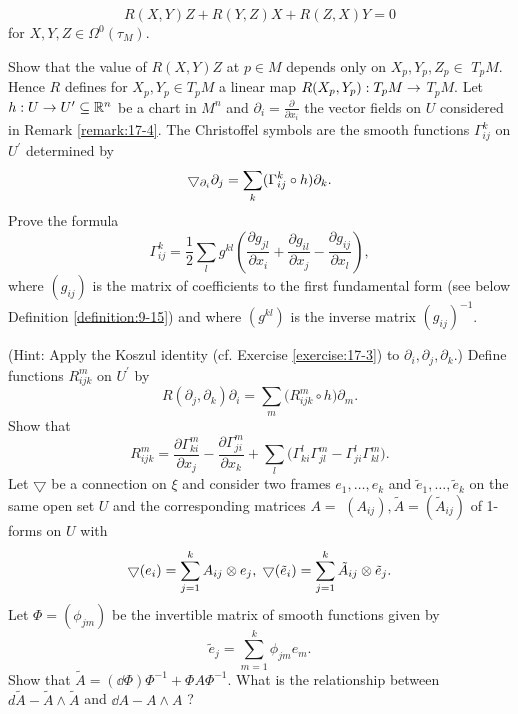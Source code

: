 \begin{enumerate}[\theexercise.1]
    \[
      R( {X,Y}) Z + R( {Y,Z}) X + R( {Z,X}) Y = 0
    \]
    for $X,Y,Z \in  {\Omega }^{0}( {\tau }_{M})$.\par
    Show that the value of $R( {X,Y}) Z$ at $p \in  M$ depends only on ${X}_{p},{Y}_{p},{Z}_{p} \in$  ${T}_{p}M$. Hence $R$ defines for ${X}_{p},{Y}_{p} \in  {T}_{p}M$ a linear map $R( {{X}_{p},{Y}_{p}})  : {T}_{p}M \rightarrow$  ${T}_{p}M$.
  \NewItem Let $h : U \rightarrow  {U}^{\prime } \subseteq  {\ensuremath{\mathbb{R}}}^{n}$ be a chart in ${M}^{n}$ and ${\partial }_{i} = \frac{\partial }{\partial {x}_{i}}$ the vector fields on $U$ considered in Remark \ref{remark:17-4}. The Christoffel symbols are the smooth functions ${\Gamma }_{ij}^{k}$ on ${U}^{\prime }$ determined by
    \[
      \bigtriangledown_{\partial_i}{\partial }_{j} = \sum_{k}( {{\Gamma }_{ij}^{k} \circ  h}) {\partial }_{k}.
    \]
    Prove the formula
    \[
      {\Gamma }_{ij}^{k} = \frac{1}{2}\sum_{l}{g}^{kl}\left( {\frac{\partial {g}_{jl}}{\partial {x}_{i}} + \frac{\partial {g}_{il}}{\partial {x}_{j}}- \frac{\partial {g}_{ij}}{\partial {x}_{l}}}\right),
    \]
    where $( {g}_{ij})$ is the matrix of coefficients to the first fundamental form (see below Definition \ref{definition:9-15}) and where $( {g}^{kl})$ is the inverse matrix ${( {g}_{ij}) }^{-1}$. \par(Hint: Apply the Koszul identity (cf. Exercise \ref{exercise:17-3}) to ${\partial }_{i},{\partial }_{j},{\partial }_{k}$.) Define functions ${R}_{ijk}^{m}$ on ${U}^{\prime }$ by
    \[
      R( {{\partial }_{j},{\partial }_{k}}) {\partial }_{i} = \sum_{m}\big( {{R}_{ijk}^{m} \circ  h}\big) {\partial }_{m}.
    \]
    Show that
    \[
      {R}_{ijk}^{m} = \frac{\partial {\Gamma }_{ki}^{m}}{\partial {x}_{j}}- \frac{\partial {\Gamma }_{ji}^{m}}{\partial {x}_{k}} + \sum_{l}\Big( {{\Gamma }_{ki}^{l}{\Gamma }_{jl}^{m}- {\Gamma }_{ji}^{l}{\Gamma }_{kl}^{m}}\Big).
    \]
  \NewItem Let $\bigtriangledown$ be a connection on $\xi$ and consider two frames ${e}_{1},\ldots,{e}_{k}$ and ${\tilde{e}}_{1},\ldots,{\tilde{e}}_{k}$ on the same open set $U$ and the corresponding matrices $A =$  $( {A}_{ij}),\tilde{A} = ( {\tilde{A}}_{ij})$ of 1-forms on $U$ with
    \[
      \bigtriangledown ( {e}_{i})  = \sum_{{j = 1}}^{k}{A}_{ij} \otimes  {e}_{j},\;\bigtriangledown ( {\tilde{e}}_{i})  = \sum_{{j = 1}}^{k}{\tilde{A}}_{ij} \otimes  {\tilde{e}}_{j}.
    \]
    Let $\Phi  = ( {\phi }_{jm})$ be the invertible matrix of smooth functions given by
    \[
      {\tilde{e}}_{j} = \sum_{{m = 1}}^{k}{\phi }_{jm}{e}_{m}.
    \]
    Show that $\tilde{A} = ( {\dd\Phi }) {\Phi }^{-1} + {\Phi A}{\Phi }^{-1}$. What is the relationship between $d\tilde{A}- \tilde{A} \land  \tilde{A}$ and ${\dd A}- A \land  A$ ?

\end{enumerate}
